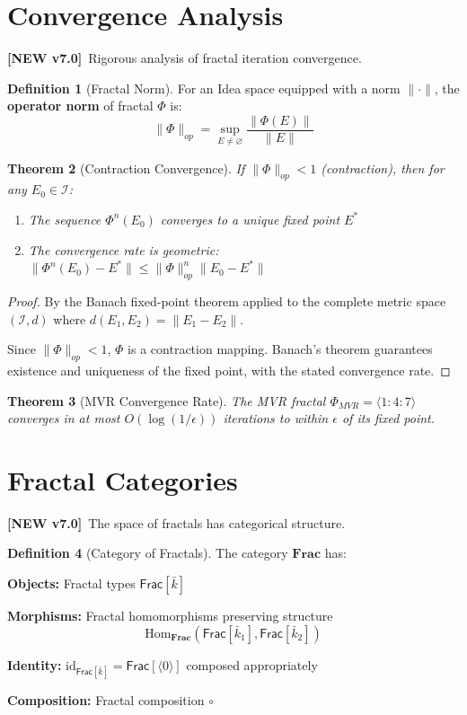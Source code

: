 \documentclass[11pt,twoside,openright]{book}
\theoremstyle{definition}
\newtheorem{definition}{Definition}[chapter]
\theoremstyle{plain}
\newtheorem{theorem}[definition]{Theorem}
\theoremstyle{remark}
\newcommand{\Ideas}{\mathcal{I}}
\newcommand{\Frac}{\Phi}
\newcommand{\Hom}{\mathrm{Hom}}
\newcommand{\id}{\mathrm{id}}
\newcommand{\vnew}{\textcolor{blue!70!black}{\textbf{[NEW v7.0]}}}
\begin{document}
\section{Convergence Analysis}
\label{sec:fractal-convergence}

\vnew\ Rigorous analysis of fractal iteration convergence.

\begin{definition}[Fractal Norm]
\label{def:fractal-norm}
For an Idea space equipped with a norm $\|\cdot\|$, the \textbf{operator norm} of fractal $\Frac$ is:
\[
\|\Frac\|_{op} = \sup_{E \neq \varnothing} \frac{\|\Frac(E)\|}{\|E\|}
\]
\end{definition}

\begin{theorem}[Contraction Convergence]
\label{thm:contraction-conv}
If $\|\Frac\|_{op} < 1$ (contraction), then for any $E_0 \in \Ideas$:
\begin{enumerate}
  \item The sequence $\Frac^n(E_0)$ converges to a unique fixed point $E^*$
  \item The convergence rate is geometric: $\|\Frac^n(E_0) - E^*\| \leq \|\Frac\|_{op}^n \|E_0 - E^*\|$
\end{enumerate}
\end{theorem}

\begin{proof}
By the Banach fixed-point theorem applied to the complete metric space $(\Ideas, d)$ where $d(E_1, E_2) = \|E_1 - E_2\|$.

Since $\|\Frac\|_{op} < 1$, $\Frac$ is a contraction mapping. Banach's theorem guarantees existence and uniqueness of the fixed point, with the stated convergence rate.
\end{proof}

\begin{theorem}[MVR Convergence Rate]
\label{thm:mvr-convergence}
The MVR fractal $\Frac_{MVR} = \langle 1:4:7 \rangle$ converges in at most $O(\log(1/\epsilon))$ iterations to within $\epsilon$ of its fixed point.
\end{theorem}

\section{Fractal Categories}
\label{sec:fractal-categories}

\vnew\ The space of fractals has categorical structure.

\begin{definition}[Category of Fractals]
\label{def:frac-category}
The category $\mathbf{Frac}$ has:

\textbf{Objects:} Fractal types $\mathsf{Frac}[\bar{k}]$

\textbf{Morphisms:} Fractal homomorphisms preserving structure
\[
\Hom_\mathbf{Frac}(\mathsf{Frac}[\bar{k}_1], \mathsf{Frac}[\bar{k}_2])
\]

\textbf{Identity:} $\id_{\mathsf{Frac}[\bar{k}]} = \mathsf{Frac}[\langle 0 \rangle]$ composed appropriately

\textbf{Composition:} Fractal composition $\circ$
\end{definition}
\end{document}

